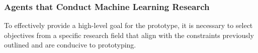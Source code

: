 


\subsubsection{Agents that Conduct Machine Learning Research}
To effectively provide a high-level goal for the prototype, it is necessary to select objectives from a specific research field that align with the constraints previously outlined and are conducive to prototyping.

